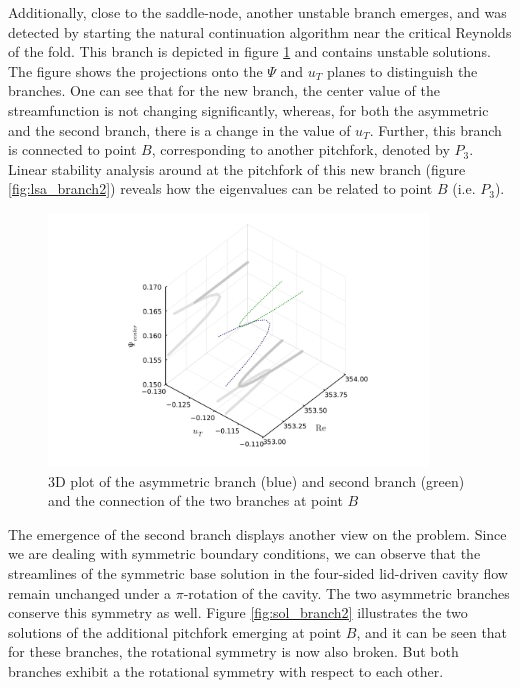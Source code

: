 Additionally, close to the saddle-node, another unstable branch emerges, and
was detected by starting the natural continuation algorithm near the critical
Reynolds of the fold. This branch is depicted in figure \ref{fig:branch2} and
contains unstable solutions. The figure shows the projections onto the $\Psi$
and $u_T$ planes to distinguish the branches. One can see that for the new
branch, the center value of the streamfunction is not changing significantly,
whereas, for both the asymmetric and the second branch, there is a change in
the value of $u_T$. Further, this branch is connected to point $B$,
corresponding to another pitchfork, denoted by $P_3$. Linear stability analysis
around at the pitchfork of this new branch (figure \ref{fig:lsa_branch2})
reveals how the eigenvalues can be related to point $B$ (i.e. $P_3$). 

\begin{figure}[h!]
  \centering
  \includegraphics[width=0.9\textwidth]{figs/branch2_64x64.png}
  \caption{3D plot of the asymmetric branch (blue) and second branch (green) and the
    connection of the two branches at point $B$}
  \label{fig:branch2}
\end{figure}

The emergence of the second branch displays another view on the problem. Since
we are dealing with symmetric boundary conditions, we can observe that the
streamlines of the symmetric base solution in the four-sided lid-driven cavity
flow remain unchanged under a $\pi$-rotation of the cavity. The two asymmetric
branches conserve this symmetry as well. Figure \ref{fig:sol_branch2}
illustrates the two solutions of the additional pitchfork emerging at point
$B$, and it can be seen that for these branches, the rotational symmetry is now
also broken. But both branches exhibit a the rotational symmetry with respect
to each other.

